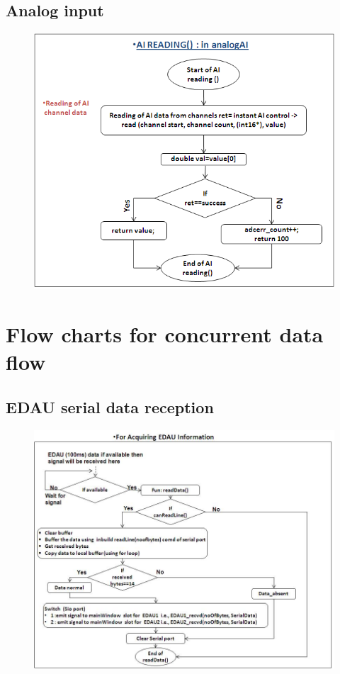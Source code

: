 \subsection{Analog input}
\begin{figure}[H]
	\centering
	\includegraphics[width=\linewidth]{./FlowCharts/PngFlowCharts/AnalogInput.png}
\end{figure}
\section{Flow charts for concurrent data flow}
\subsection{EDAU serial data reception}
\begin{figure}[H]
	\centering
	\includegraphics[width=\linewidth]{./FlowCharts/PngFlowCharts/SG1_EDAU.png}
\end{figure}
